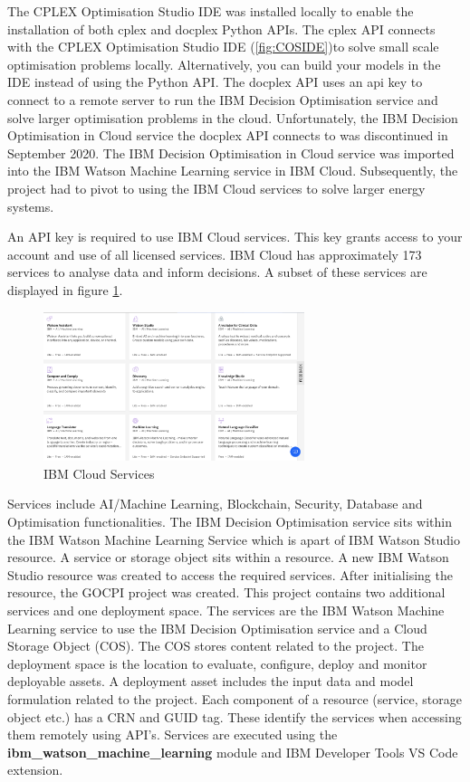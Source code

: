 \documentclass[12pt]{article}
\begin{document}
The CPLEX Optimisation Studio IDE was installed locally to enable the installation of both cplex and docplex Python APIs.
The cplex API connects with the CPLEX Optimisation Studio IDE (\ref{fig:COSIDE})to solve small scale optimisation problems locally.
Alternatively, you can build your models in the IDE instead of using the Python API.
The docplex API uses an api key to connect to a remote server to run the IBM Decision Optimisation service and solve larger optimisation problems in the cloud.
Unfortunately, the IBM Decision Optimisation in Cloud service the docplex API connects to was discontinued in September 2020.
The IBM Decision Optimisation in Cloud service was imported into the IBM Watson Machine Learning service in IBM Cloud. 
Subsequently, the project had to pivot to using the IBM Cloud services to solve larger energy systems.

An API key is required to use IBM Cloud services. 
This key grants access to your account and use of all licensed services.
IBM Cloud has approximately 173 services to analyse data and inform decisions. 
A subset of these services are displayed in figure \ref{fig:IBMCS}. 

\begin{figure}
	\begin{center}
		\includegraphics[width=0.68\textwidth]{IBM-cloud-services.png}
	\end{center}
	\caption{IBM Cloud Services}
	\label{fig:IBMCS}
\end{figure}

Services include AI/Machine Learning, Blockchain, Security, Database and Optimisation functionalities.
The IBM Decision Optimisation service sits within the IBM Watson Machine Learning Service
which is apart of IBM Watson Studio resource.
A service or storage object sits within a resource.
A new IBM Watson Studio resource was created to access the required services.
After initialising the resource, the GOCPI project was created.
This project contains two additional services and one deployment space.
The services are the IBM Watson Machine Learning service to use the IBM Decision Optimisation service and a Cloud Storage Object (COS).
The COS stores content related to the project. 
The deployment space is the location to evaluate, configure, deploy and monitor deployable assets.
A deployment asset includes the input data and model formulation related to the project.
Each component of a resource (service, storage object etc.) has a CRN and GUID tag. 
These identify the services when accessing them remotely using API's.
Services are executed using the \textbf{ibm\_watson\_machine\_learning} module and IBM Developer Tools VS Code extension.
\end{document}
